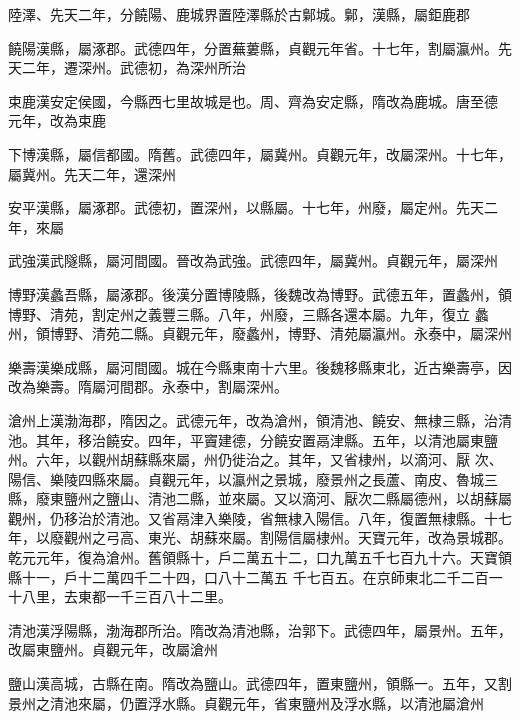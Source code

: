 \begin{pinyinscope}
 陸澤、先天二年，分饒陽、鹿城界置陸澤縣於古鄡城。鄡，漢縣，屬鉅鹿郡



 饒陽漢縣，屬涿郡。武德四年，分置蕪蔞縣，貞觀元年省。十七年，割屬瀛州。先天二年，遷深州。武德初，為深州所治



 束鹿漢安定侯國，今縣西七里故城是也。周、齊為安定縣，隋改為鹿城。唐至德
 元年，改為束鹿



 下博漢縣，屬信都國。隋舊。武德四年，屬冀州。貞觀元年，改屬深州。十七年，屬冀州。先天二年，還深州



 安平漢縣，屬涿郡。武德初，置深州，以縣屬。十七年，州廢，屬定州。先天二年，來屬



 武強漢武隧縣，屬河間國。晉改為武強。武德四年，屬冀州。貞觀元年，屬深州



 博野漢蠡吾縣，屬涿郡。後漢分置博陵縣，後魏改為博野。武德五年，置蠡州，領博野、清苑，割定州之義豐三縣。八年，州廢，三縣各還本屬。九年，復立
 蠡州，領博野、清苑二縣。貞觀元年，廢蠡州，博野、清苑屬瀛州。永泰中，屬深州



 樂壽漢樂成縣，屬河間國。城在今縣東南十六里。後魏移縣東北，近古樂壽亭，因改為樂壽。隋屬河間郡。永泰中，割屬深州。



 滄州上漢渤海郡，隋因之。武德元年，改為滄州，領清池、饒安、無棣三縣，治清池。其年，移治饒安。四年，平竇建德，分饒安置鬲津縣。五年，以清池屬東鹽州。六年，以觀州胡蘇縣來屬，州仍徙治之。其年，又省棣州，以滴河、厭
 次、陽信、樂陵四縣來屬。貞觀元年，以瀛州之景城，廢景州之長蘆、南皮、魯城三縣，廢東鹽州之鹽山、清池二縣，並來屬。又以滴河、厭次二縣屬德州，以胡蘇屬觀州，仍移治於清池。又省鬲津入樂陵，省無棣入陽信。八年，復置無棣縣。十七年，以廢觀州之弓高、東光、胡蘇來屬。割陽信屬棣州。天寶元年，改為景城郡。乾元元年，復為滄州。舊領縣十，戶二萬五十二，口九萬五千七百九十六。天寶領縣十一，戶十二萬四千二十四，口八十二萬五
 千七百五。在京師東北二千二百一十八里，去東都一千三百八十二里。



 清池漢浮陽縣，渤海郡所治。隋改為清池縣，治郭下。武德四年，屬景州。五年，改屬東鹽州。貞觀元年，改屬滄州



 鹽山漢高城，古縣在南。隋改為鹽山。武德四年，置東鹽州，領縣一。五年，又割景州之清池來屬，仍置浮水縣。貞觀元年，省東鹽州及浮水縣，以清池屬滄州




\end{pinyinscope}
